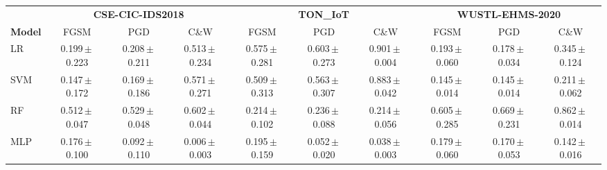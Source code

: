 \begin{tabular}{lccccccccc}
\toprule
 & \multicolumn{3}{c}{\textbf{CSE-CIC-IDS2018}} & \multicolumn{3}{c}{\textbf{TON\_IoT}} & \multicolumn{3}{c}{\textbf{WUSTL-EHMS-2020}} \\
\cmidrule(lr){2-4}\cmidrule(lr){5-7}\cmidrule(lr){8-10}
\textbf{Model} & FGSM & PGD & C\&W & FGSM & PGD & C\&W & FGSM & PGD & C\&W \\
\midrule
LR & 0.199\,$\pm$\,0.223 & 0.208\,$\pm$\,0.211 & 0.513\,$\pm$\,0.234 & 0.575\,$\pm$\,0.281 & 0.603\,$\pm$\,0.273 & 0.901\,$\pm$\,0.004 & 0.193\,$\pm$\,0.060 & 0.178\,$\pm$\,0.034 & 0.345\,$\pm$\,0.124 \\
SVM & 0.147\,$\pm$\,0.172 & 0.169\,$\pm$\,0.186 & 0.571\,$\pm$\,0.271 & 0.509\,$\pm$\,0.313 & 0.563\,$\pm$\,0.307 & 0.883\,$\pm$\,0.042 & 0.145\,$\pm$\,0.014 & 0.145\,$\pm$\,0.014 & 0.211\,$\pm$\,0.062 \\
RF & 0.512\,$\pm$\,0.047 & 0.529\,$\pm$\,0.048 & 0.602\,$\pm$\,0.044 & 0.214\,$\pm$\,0.102 & 0.236\,$\pm$\,0.088 & 0.214\,$\pm$\,0.056 & 0.605\,$\pm$\,0.285 & 0.669\,$\pm$\,0.231 & 0.862\,$\pm$\,0.014 \\
MLP & 0.176\,$\pm$\,0.100 & 0.092\,$\pm$\,0.110 & 0.006\,$\pm$\,0.003 & 0.195\,$\pm$\,0.159 & 0.052\,$\pm$\,0.020 & 0.038\,$\pm$\,0.003 & 0.179\,$\pm$\,0.060 & 0.170\,$\pm$\,0.053 & 0.142\,$\pm$\,0.016 \\
\bottomrule
\end{tabular}